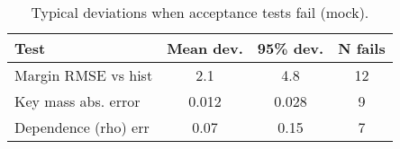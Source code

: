\begin{table}[t]
  \centering
  \small
  \caption{Typical deviations when acceptance tests fail (mock).}
  \begin{tabular}{lccc}
    \toprule
    Test & Mean dev. & 95\% dev. & N fails \\
    \midrule
    Margin RMSE vs hist & 2.1 & 4.8 & 12 \\
    Key mass abs. error & 0.012 & 0.028 & 9 \\
    Dependence (rho) err & 0.07 & 0.15 & 7 \\
    \bottomrule
  \end{tabular}
\end{table}
